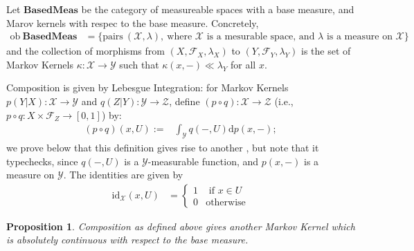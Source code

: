 \documentclass[twoside]{article} %
\theoremstyle{plain}
\newtheorem{prop}[theorem]{Proposition}
\theoremstyle{definition}
\newcommand{\BaseMeas}{\mathbf{BasedMeas}}
\begin{document}
    \begin{defn}
        Let $\BaseMeas$ be the category of measureable spaces with a base measure, and Marov kernels with respec to the base measure.
        Concretely,
        \begin{align*}
            \mathrm{ob}~\BaseMeas &= \Big\{ \text{pairs}~(\mathcal X, \lambda),
                ~\text{where $\mathcal X$ is a mesurable space, and $\lambda$ is a measure on $\mathcal X$} \Big\}%
        \end{align*}
        and the collection of morphisms from 
        $(X,\mathcal F_X, \lambda_X)$ to $(Y, \mathcal F_Y, \lambda_Y)$ is the 
        set of Markov Kernels $\kappa : \mathcal X \to \mathcal Y$ such that 
        $\kappa(x,-) \ll \lambda_Y$ for all $x$.        
        
        Composition is given by Lebesgue Integration: for Markov Kernels $p(Y|X) : \mathcal X \to \mathcal Y$ and $q(Z|Y) : \mathcal Y \to \mathcal Z$, define
        $(p \circ q) : \mathcal X \to \mathcal Z$  (i.e., $p \circ q : X \times \mathcal F_Z \to [0,1]$) by:
        \begin{align*}
            (p\circ q)(x, U) :=& \int_{\mathcal Y}
                q(-, U)
                \mathrm d p(x,-);
        \end{align*}
        we prove below that this definition gives rise to another , but note that it typechecks, since $q(-,U)$ is a $\mathcal Y$-measurable function, and $p(x,-)$ is a measure on $\mathcal Y$. 
        The identities are given by
        \begin{align*}
        \mathrm{id}_{\mathcal X}(x, U) &= \begin{cases}
                1 & \text{ if }x \in U \\ 0 & \text{otherwise}
            \end{cases}
        \end{align*}
    \end{defn}
    \begin{prop}
        Composition as defined above gives another Markov Kernel which is absolutely continuous with respect to the base measure.        
    \end{prop}
\end{document}
